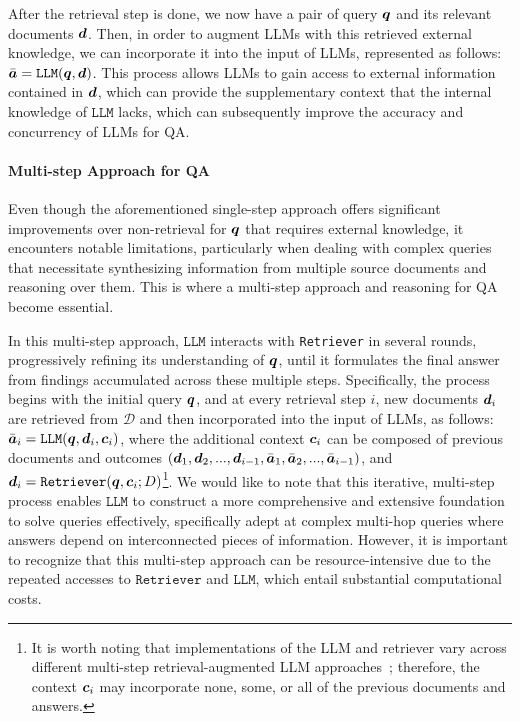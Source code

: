 After the retrieval step is done, we now have a pair of query ${\bm{q}}$ and its relevant documents ${\bm{d}}$. Then, in order to augment LLMs with this retrieved external knowledge, we can incorporate it into the input of LLMs, represented as follows: $\bar{{\bm{a}}} = \texttt{LLM}({\bm{q}}, {\bm{d}})$. This process allows LLMs to gain access to external information contained in ${\bm{d}}$, which can provide the supplementary context that the internal knowledge of $\texttt{LLM}$ lacks, which can subsequently improve the accuracy and concurrency of LLMs for QA. 

\paragraph{Multi-step Approach for QA}
Even though the aforementioned single-step approach offers significant improvements over non-retrieval for ${\bm{q}}$ that requires external knowledge, it encounters notable limitations, particularly when dealing with complex queries that necessitate synthesizing information from multiple source documents and reasoning over them. This is where a multi-step approach and reasoning for QA become essential. 

In this multi-step approach, $\texttt{LLM}$ interacts with \texttt{Retriever} in several rounds, progressively refining its understanding of ${\bm{q}}$, until it formulates the final answer from findings accumulated across these multiple steps. Specifically, the process begins with the initial query ${\bm{q}}$, and at every retrieval step $i$, new documents ${\bm{d}}_i$ are retrieved from $\mathcal{D}$ and then incorporated into the input of LLMs, as follows: $\bar{{\bm{a}}}_i = \texttt{LLM}({\bm{q}}, {\bm{d}}_i, {\bm{c}}_i)$, where the additional context ${\bm{c}}_i$ can be composed of previous documents and outcomes $({\bm{d}}_1, {\bm{d}}_2, ..., {\bm{d}}_{i-1}, \bar{{\bm{a}}}_1, \bar{{\bm{a}}}_2, ..., \bar{{\bm{a}}}_{i-1})$, and ${\bm{d}}_i = \texttt{Retriever}({\bm{q}}, {\bm{c}}_i; D)$\footnote{It is worth noting that implementations of the LLM and retriever vary across different multi-step retrieval-augmented LLM approaches~\cite{ircot, self-ask, react}; therefore, the context ${\bm{c}}_i$ may incorporate none, some, or all of the previous documents and answers.}. We would like to note that this iterative, multi-step process enables $\texttt{LLM}$ to construct a more comprehensive and extensive foundation to solve queries effectively, specifically adept at complex multi-hop queries where answers depend on interconnected pieces of information. However, it is important to recognize that this multi-step approach can be resource-intensive due to the repeated accesses to $\texttt{Retriever}$ and $\texttt{LLM}$, which entail substantial computational costs.


